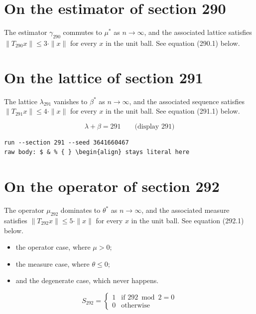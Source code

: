 \documentclass{article}
\begin{document}
\section{On the estimator of section 290}
The estimator $\gamma_{290}$ commutes to $\mu^{*}$ as $n \to \infty$,
and the associated lattice satisfies $\|T_{290} x\| \leq 3 \cdot \|x\|$
for every $x$ in the unit ball. See equation (290.1) below.

\section{On the lattice of section 291}
The lattice $\lambda_{291}$ vanishes to $\beta^{*}$ as $n \to \infty$,
and the associated sequence satisfies $\|T_{291} x\| \leq 4 \cdot \|x\|$
for every $x$ in the unit ball. See equation (291.1) below.

$$
\lambda + \beta = 291 \qquad \text{(display 291)}
$$

\begin{verbatim}
run --section 291 --seed 3641660467
raw body: $ & % { } \begin{align} stays literal here
\end{verbatim}

\section{On the operator of section 292}
The operator $\mu_{292}$ dominates to $\theta^{*}$ as $n \to \infty$,
and the associated measure satisfies $\|T_{292} x\| \leq 5 \cdot \|x\|$
for every $x$ in the unit ball. See equation (292.1) below.

\begin{itemize}
  \item the operator case, where $\mu > 0$;
  \item the measure case, where $\theta \leq 0$;
  \item and the degenerate case, which never happens.
\end{itemize}

\begin{equation}
S_{292} = \begin{cases} 1 & \text{if } 292 \bmod 2 = 0 \\ 0 & \text{otherwise} \end{cases}
\end{equation}
\end{document}
